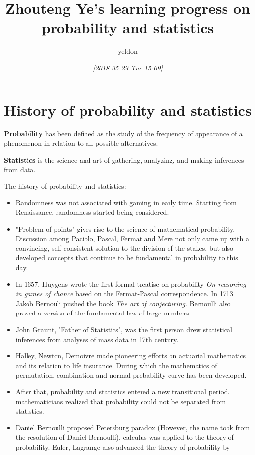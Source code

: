 \documentclass[11pt]{article}
\author{yeldon}
\date{\textit{[2018-05-29 Tue 15:09]}}
\title{Zhouteng Ye's learning progress on probability and statistics}
\begin{document}
\maketitle
\tableofcontents


\section{History of probability and statistics}
\label{sec:orgd1f6257}
\textbf{Probability} has been defined as the study of the frequency of appearance of a
phenomenon in relation to all possible alternatives. 

\textbf{Statistics} is the science and art of gathering, analyzing, and making
inferences from data.


The history of probability and statistics:
\begin{itemize}
\item Randomness was not associated with gaming in early time. Starting from
Renaissance, randomness started being considered.
\item "Problem of points" gives rise to the science of mathematical probability.
Discussion among Paciolo, Pascal, Fermat and Mere not only came up with a
convincing, self-consistent solution to the division of the stakes, but also
developed concepts that continue to be fundamental in probability to this day.
\item In 1657, Huygens wrote the first formal treatise on probability \emph{On reasoning
in games of chance} based on the Fermat-Pascal correspondence. In 1713 Jakob
Bernouli pushed the book \emph{The art of conjecturing}. Bernoulli also proved a
version of the fundamental law of large numbers.
\item John Graunt, "Father of Statistics", was the first person drew statistical
inferences from analyses of mass data in 17th century.
\item Halley, Newton, Demoivre made pioneering efforts on actuarial mathematics and
its relation to life insurance. During which the mathematics of permutation,
combination and normal probability curve has been developed.
\item After that, probability and statistics entered a new transitional period.
mathematicians realized that probability could not be separated from
statistics.
\item Daniel Bernoulli proposed Petersburg paradox (However, the name took from the
resolution of Daniel Bernoulli), calculus was applied to the theory of
probability. Euler, Lagrange also advanced the theory of probability by

\end{itemize}
\end{document}
